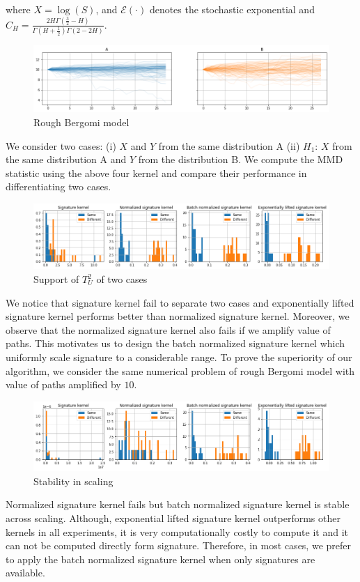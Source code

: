 \documentclass[12pt]{report}
\theoremstyle{definition}
\theoremstyle{remark}
\begin{document}
where $X = \log(S)$, and $\mathcal{E}(\cdot)$ denotes the stochastic exponential and $C_{H} = \frac{2 H \Gamma(\frac{3}{2} - H)}{\Gamma(H+\frac{1}{2})\Gamma(2 - 2H)}$. 
 \begin{figure}[H]
    \centering
    \includegraphics[width=\textwidth]{figs/estimation3.png}
    \caption{Rough Bergomi model}
\end{figure}
We consider two cases: (i) $X$ and $Y$ from the same distribution A (ii) $H_{1}$: $X$ from the same distribution A and $Y$ from the distribution B. We compute the MMD statistic using the above four kernel and compare their performance in differentiating two cases.
 \begin{figure}[H]
    \centering
    \includegraphics[width=\textwidth]{figs/estimation4.png}
    \caption{Support of $T_{U}^{2}$ of two cases}
\end{figure}
We notice that signature kernel fail to separate two cases and exponentially lifted signature kernel performs better than normalized signature kernel. Moreover, we observe that the normalized signature kernel also fails if we amplify value of paths. This motivates us to design the batch normalized signature kernel which uniformly scale signature to a considerable range. To prove the superiority of our algorithm, we consider the same numerical problem of rough Bergomi model with value of paths amplified by $10$.
 \begin{figure}[H]
    \centering
    \includegraphics[width=\textwidth]{figs/estimation5.png}
    \caption{Stability in scaling}
\end{figure}
Normalized signature kernel fails but batch normalized signature kernel is stable across scaling. Although, exponential lifted signature kernel outperforms other kernels in all experiments, it is very computationally costly to compute it and it can not be computed directly form signature. Therefore, in most cases, we prefer to apply the batch normalized signature kernel when only signatures are available. 
\end{document}
